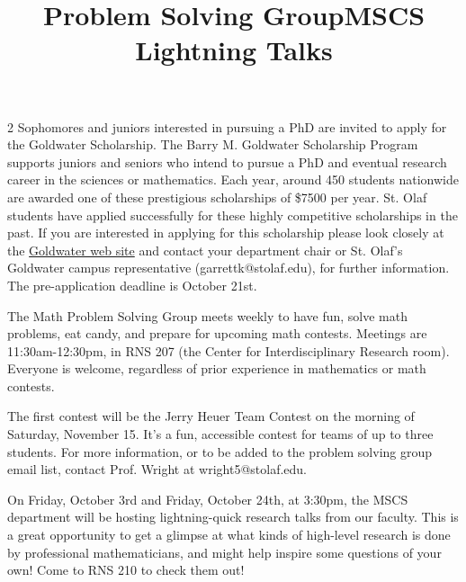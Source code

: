 \documentclass[12pt]{article}
\newcommand{\bolder}{\textbf}
\begin{document}
\begin{multicols}{2}
Sophomores and juniors interested in pursuing a PhD are invited to apply for the Goldwater Scholarship. The Barry M. Goldwater Scholarship Program supports juniors and seniors who intend to pursue a PhD and eventual research career in the sciences or mathematics.  Each year, around 450 students nationwide are awarded one of these prestigious scholarships of \$7500 per year. St. Olaf students have applied successfully for these highly competitive scholarships in the past. If you are interested in applying for this scholarship please look closely at the \href{https://goldwaterscholarship.gov/}{Goldwater web site} and contact your department chair or St. Olaf’s Goldwater campus representative (garrettk@stolaf.edu), for further information. The pre-application deadline is October 21st.


\begin{tcolorbox}[colback=white, colframe=black]
    \begin{center}
    \title{{\large \bolder{Problem Solving Group}}}
    \end{center}
\end{tcolorbox}
The Math Problem Solving Group meets weekly to have fun, solve math problems, eat candy, and prepare for upcoming math contests. Meetings are 11:30am-12:30pm, in RNS 207 (the Center for Interdisciplinary Research room). Everyone is welcome, regardless of prior experience in mathematics or math contests.

The first contest will be the Jerry Heuer Team Contest on the morning of Saturday, November 15. It's a fun, accessible contest for teams of up to three students. For more information, or to be added to the problem solving group email list, contact Prof. Wright at wright5@stolaf.edu.


\begin{tcolorbox}[colback=white, colframe=black]
    \begin{center}
    \title{{\large \bolder{MSCS Lightning Talks}}}
    \end{center}
\end{tcolorbox}

On Friday, October 3rd and Friday, October 24th, at 3:30pm, the MSCS department will be hosting lightning-quick research talks from our faculty. This is a great opportunity to get a glimpse at what kinds of high-level research is done by professional mathematicians, and might help inspire some questions of your own! Come to RNS 210 to check them out!




\end{multicols}
\end{document}
